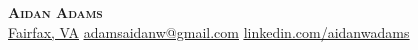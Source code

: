 \begin{center}
    \textbf{\Huge \scshape Aidan Adams} \\ \vspace{1pt}
     \underline{Fairfax, VA}\quad
    \href{mailto:adamsaidanw@gmail.com}{ \underline{adamsaidanw@gmail.com}} \quad
    \href{https://www.linkedin.com/in/aidanwadams}{ \underline{linkedin.com/aidanwadams}} \quad
    
\end{center}